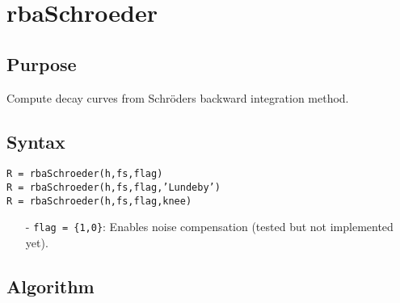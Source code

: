 
\chapter{rbaSchroeder} %
\label{cha:rbaSchroeder} %

\section{Purpose} %
\label{sec:rbaSchroeder_purpose}
Compute decay curves from Schröders backward integration method.


\section{Syntax} %
\label{sec:rbaSchroeder_syntax}
\texttt{R = rbaSchroeder(h,fs,flag)}\\
\texttt{R = rbaSchroeder(h,fs,flag,'Lundeby')}\\
\texttt{R = rbaSchroeder(h,fs,flag,knee)}
\begin{itemize}
	\item[-] \texttt{flag = \{1,0\}}: Enables noise compensation (tested but not implemented yet).
\end{itemize}


\section{Algorithm} %
\label{sec:rbaSchroeder_algorithm}



